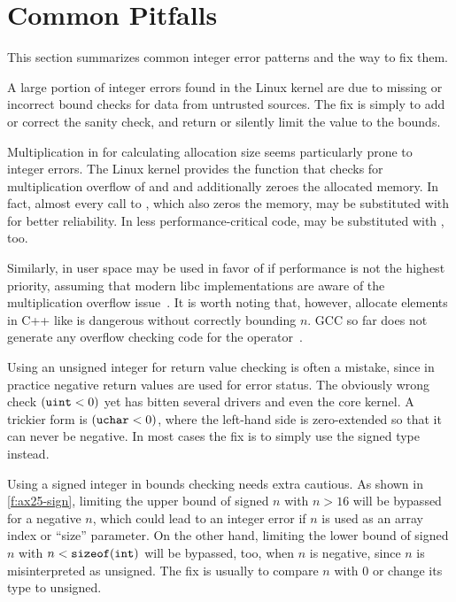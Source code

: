 \section{Common Pitfalls}
\label{s:common}

This section summarizes common integer error patterns and the way
to fix them.

A large portion of integer errors found in the Linux kernel are
due to missing or incorrect bound checks for data from untrusted
sources.  The fix is simply to add or correct the sanity check,
and return  or silently limit the value to the bounds.

Multiplication in for calculating allocation size seems particularly
prone to integer errors.  The Linux kernel provides the function
 that checks for multiplication overflow
of  and  and additionally zeroes the allocated
memory.  In fact, almost every call to ,
which also zeros the memory, may be substituted with 
for better reliability.  In less performance-critical code,
 may be substituted with , too.

Similarly, in user space  may be used in favor of
 if performance is not the highest priority,
assuming that modern libc implementations are aware
of the multiplication overflow issue~\cite{rus-cert:calloc}.  It
is worth noting that, however, allocate elements in C++ like  is dangerous without correctly bounding $n$.  GCC so far
does not generate any overflow checking code for the 
operator~\cite{gcc-new}.

Using an unsigned integer for return value checking is often a mistake,
since in practice negative return values are used for error status.
The obviously wrong check $(\texttt{uint} < 0)$ yet has bitten several
drivers and even the core kernel.  A trickier form is $(\texttt{uchar}
< 0)$, where the left-hand side is zero-extended so that it can
never be negative.  In most cases the fix is to simply use the
signed type instead.

Using a signed integer in bounds checking needs extra cautious.  As
shown in \autoref{f:ax25-sign}, limiting the upper bound of signed
$n$ with $n > 16$ will be bypassed for a negative $n$, which could
lead to an integer error if $n$ is used as an array index or ``size''
parameter.  On the other hand, limiting the lower bound of signed
$n$ with $n < \texttt{sizeof}(\texttt{int})$ will be bypassed, too, when
$n$ is negative, since $n$ is misinterpreted as unsigned.  The fix
is usually to compare $n$ with 0 or change its type to unsigned.

